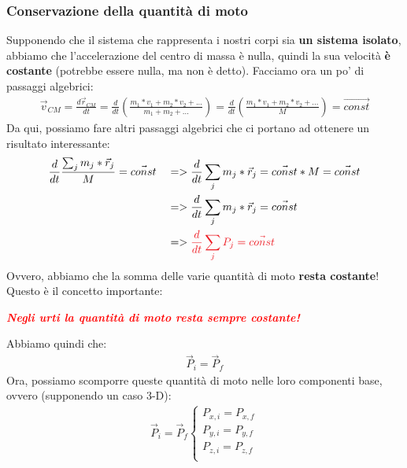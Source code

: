        \subsubsection{Conservazione della quantità di moto}
            Supponendo che il sistema che rappresenta i nostri corpi sia \textbf{un sistema isolato}, abbiamo che l'accelerazione del centro di massa è nulla, quindi la sua velocità \textbf{è costante} (potrebbe essere nulla, ma non è detto). Facciamo ora un po' di passaggi algebrici:
            \begin{align*}
                \vec{v}_{CM} = \frac{d\vec{r}_{CM}}{dt} = \frac{d}{dt}(\frac{m_1*v_1+m_2*v_2+...}{m_1+m_2+...})=\frac{d}{dt}(\frac{m_1*v_1+m_2*v_2+...}{M})=\vec{const}
            \end{align*}
            Da qui, possiamo fare altri passaggi algebrici che ci portano ad ottenere un risultato interessante:
            \begin{align*}
                &\frac{d}{dt}\frac{\sum_jm_j*\vec{r}_j}{M}=\vec{const}&&=>\frac{d}{dt}\sum_jm_j*\vec{r}_j = \vec{const}*M = \vec{const}\\
                & &&=>\frac{d}{dt}\sum_jm_j*\vec{r}_j = \vec{const}\\
                & &&=>\textcolor{Red}{\frac{d}{dt}\sum_jP_j = \vec{const}}
            \end{align*}
            Ovvero, abbiamo che la somma delle varie quantità di moto \textbf{resta costante}! Questo è il concetto importante:
            \begin{center}
                \textcolor{Red}{\textbf{\textit{Negli urti la quantità di moto resta sempre costante!}}}
            \end{center}
            Abbiamo quindi che:
            \begin{align*}
                \vec{P}_i=\vec{P}_f
            \end{align*}
            Ora, possiamo scomporre queste quantità di moto nelle loro componenti base, ovvero (supponendo un caso 3-D):
            \begin{align*}
                \vec{P}_i=\vec{P}_f
                \begin{cases}
                    P_{x, i} = P_{x, f}\\
                    P_{y, i} = P_{y, f}\\
                    P_{z, i} = P_{z, f}\\
                \end{cases}
            \end{align*}
